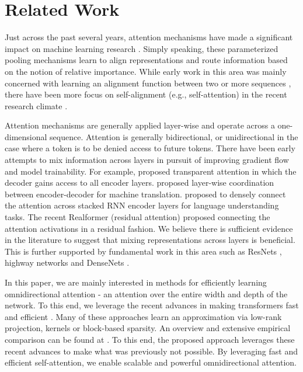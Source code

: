 \documentclass{article}
\begin{document}
\section{Related Work}
Just across the past several years, attention mechanisms \citep{bahdanau2014neural} have made a significant impact on machine learning research \citep{vaswani2017attention,devlin2018bert,dosovitskiy2020image,raffel2019exploring,brown2020language,dehghani2018universal}. Simply speaking, these parameterized pooling mechanisms learn to align representations and route information based on the notion of relative importance. While early work in this area was mainly concerned with learning an alignment function between two or more sequences \citep{bahdanau2014neural,parikh2016decomposable}, there have been more focus on self-alignment (e.g., self-attention) in the recent research climate \citep{vaswani2017attention}. 

Attention mechanisms are generally applied layer-wise and operate across a one-dimensional sequence. Attention is generally bidirectional, or unidirectional in the case where a token is to be denied access to future tokens. There have been early attempts to mix information across layers in pursuit of improving gradient flow and model trainability. For example, \citep{bapna2018training} proposed transparent attention in which the decoder gains access to all encoder layers. \citep{he2018layer} proposed layer-wise coordination between encoder-decoder for machine translation. \citep{tay2018densely} proposed to densely connect the attention across stacked RNN encoder layers for language understanding tasks. The recent Realformer (residual attention) \citep{he2020realformer} proposed connecting the attention activations in a residual fashion. We believe there is sufficient evidence in the literature to suggest that mixing representations across layers is beneficial. This is further supported by fundamental work in this area such as ResNets \citep{he2016deep}, highway networks \citep{srivastava2015highway} and DenseNets \citep{huang2017densely}.

In this paper, we are mainly interested in methods for efficiently learning omnidirectional attention - an attention over the entire width and depth of the network. To this end, we leverage the recent advances in making transformers fast and efficient \citep{zaheer2020big,choromanski2020rethinking,wang2020linformer}. Many of these approaches learn an approximation via low-rank projection, kernels or block-based sparsity. An overview and extensive empirical comparison can be found at \citep{tay2020efficient,tay2020long}. To this end, the proposed approach leverages these recent advances to make what was previously not possible. By leveraging fast and efficient self-attention, we enable scalable and powerful omnidirectional attention.
\end{document}
